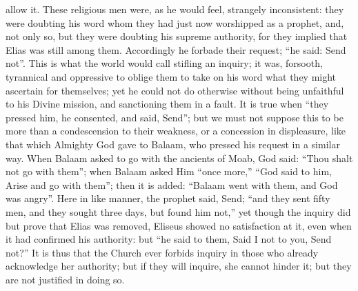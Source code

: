 allow it. These religious men were, as he would feel, strangely
inconsistent: they were doubting his word whom they had just now
worshipped as a prophet, and, not only so, but they were doubting his
supreme authority, for they implied that Elias was still among them.
Accordingly he forbade their request; ``he said: Send not''.
This is what the world would call stifling an inquiry; it was,
forsooth, tyrannical and oppressive to oblige them to take on his word
what they might ascertain for themselves; yet he could not do
otherwise without being unfaithful to his Divine mission, and
sanctioning them in a fault. It is true when ``they pressed him,
he consented, and said, Send''; but we must not suppose this to be
more than a condescension to their weakness, or a concession in
displeasure, like that which Almighty God gave to Balaam, who pressed
his request in a similar way. When Balaam asked to go with the
ancients of Moab, God said: ``Thou shalt not go with them'';
when Balaam asked Him ``once more,'' ``God said to him,
Arise and go with them''; then it is added: ``Balaam went with
them, and God was angry''. Here in like manner, the prophet said,
Send; ``and they sent fifty men, and they sought three days, but
found him not,'' yet though the inquiry did but prove that Elias
was removed, Eliseus showed no satisfaction at it, even when it had
confirmed his authority: but ``he said to them, Said I not to you,
Send not?'' It is thus that the Church ever forbids inquiry in
those who already acknowledge her authority; but if they will inquire,
she cannot hinder it; but they are not justified in doing so.

